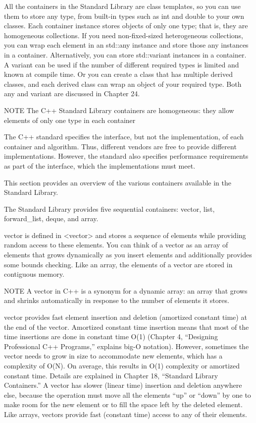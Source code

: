 All the containers in the Standard Library are class templates, so you can use them to store any type, from built-in types such as int and double to your own classes. Each container instance stores objects of only one type; that is, they are homogeneous collections. If you need non-fixed-sized heterogeneous collections, you can wrap each element in an std::any instance and store those any instances in a container. Alternatively, you can store std::variant instances in a container. A variant can be used if the number of different required types is limited and known at compile time. Or you can create a class that has multiple derived classes, and each derived class can wrap an object of your required type. Both any and variant are discussed in Chapter 24.

\begin{myNotic}{NOTE}
The C++ Standard Library containers are homogeneous: they allow elements of only one type in each container
\end{myNotic}

The C++ standard specifies the interface, but not the implementation, of each container and algorithm. Thus, different vendors are free to provide different implementations. However, the standard also specifies performance requirements as part of the interface, which the implementations must meet.

This section provides an overview of the various containers available in the Standard Library.


The Standard Library provides five sequential containers: vector, list, forward\_list, deque, and array.


vector is defined in <vector> and stores a sequence of elements while providing random access to these elements. You can think of a vector as an array of elements that grows dynamically as you insert elements and additionally provides some bounds checking. Like an array, the elements of a vector are stored in contiguous memory.

\begin{myNotic}{NOTE}
A vector in C++ is a synonym for a dynamic array: an array that grows and shrinks automatically in response to the number of elements it stores.
\end{myNotic}

vector provides fast element insertion and deletion (amortized constant time) at the end of the vector. Amortized constant time insertion means that most of the time insertions are done in constant time O(1) (Chapter 4, “Designing Professional C++ Programs,” explains big-O notation). However, sometimes the vector needs to grow in size to accommodate new elements, which has a complexity of O(N). On average, this results in O(1) complexity or amortized constant time. Details are explained in Chapter 18, “Standard Library Containers.” A vector has slower (linear time) insertion and deletion anywhere else, because the operation must move all the elements “up” or “down” by one to make room for the new element or to fill the space left by the deleted element. Like arrays, vectors provide fast (constant time) access to any of their elements.

